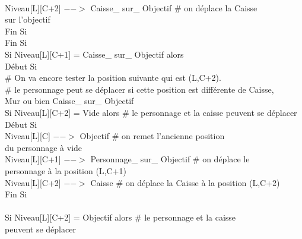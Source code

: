 \documentclass{article}
\begin{document}
\begin{tabbing}
\\	\hspace{5cm}			Niveau[L][C+2] $-->$ Caisse\_ sur\_ Objectif	\# on déplace la Caisse
\\ \hspace{5cm} sur l'objectif
\\	\hspace{4cm}		Fin Si
\\	\hspace{3cm}	Fin Si 
\\	\hspace{3cm}	Si Niveau[L][C+1] = Caisse\_ sur\_ Objectif alors			
\\	\hspace{3cm}	Début Si
\\	\hspace{4cm}		\# On va encore tester la position suivante qui est (L,C+2). 
\\	\hspace{4cm}		\# le personnage peut se déplacer si cette position est différente de Caisse,
\\ \hspace{4cm} Mur ou bien Caisse\_ sur\_ Objectif
\\	\hspace{4cm}		Si Niveau[L][C+2] = Vide alors         			\# le personnage et la caisse peuvent se déplacer
\\	\hspace{4cm}		Début Si
\\	\hspace{5cm}			Niveau[L][C] $-->$ Objectif 			\# on remet l'ancienne position
\\ \hspace{5cm} du personnage à vide
\\	\hspace{5cm}			Niveau[L][C+1] $-->$ Personnage\_ sur\_ Objectif	\# on déplace le
\\ \hspace{5cm} personnage à la position (L,C+1)
\\	\hspace{5cm}			Niveau[L][C+2] $-->$ Caisse			\# on déplace la Caisse à la position (L,C+2)
\\	\hspace{4cm}		Fin Si
\\
\\	\hspace{4cm}		Si Niveau[L][C+2] = Objectif alors         		\# le personnage et la caisse
\\ \hspace{4cm} peuvent se déplacer

\end{tabbing}
\end{document}
